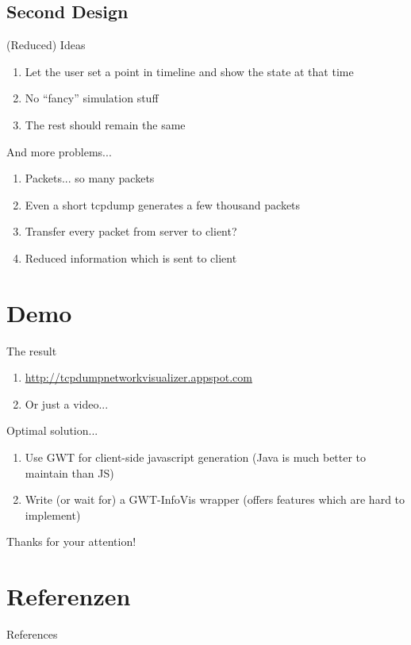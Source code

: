 \documentclass{beamer}
\begin{document}
\subsection{Second Design}

\begin{frame}{(Reduced) Ideas}
 \begin{enumerate}
  \item Let the user set a point in timeline and show the state at that time
  \item No ``fancy'' simulation stuff
  \item The rest should remain the same
 \end{enumerate}

\end{frame}


\begin{frame}{And more problems...}
 \begin{enumerate}
  \item Packets... so many packets
  \item Even a short tcpdump generates a few thousand packets
  \item Transfer every packet from server to client?
  \item Reduced information which is sent to client
 \end{enumerate}
\end{frame}

\section{Demo}

\begin{frame}{The result}
\begin{enumerate}
 \item \url{http://tcpdumpnetworkvisualizer.appspot.com}
 \item Or just a video...
\end{enumerate}
\end{frame}

\begin{frame}{Optimal solution...}
\begin{enumerate}
 \item Use GWT for client-side javascript generation (Java is much better to maintain than JS)
 \item Write (or wait for) a GWT-InfoVis wrapper (offers features which are hard to implement)
\end{enumerate}
\end{frame}


\begin{frame}
  Thanks for your attention!
\end{frame}


\section{Referenzen}

\begin{frame}{References}
\printbibliography
\end{frame}
\end{document}
